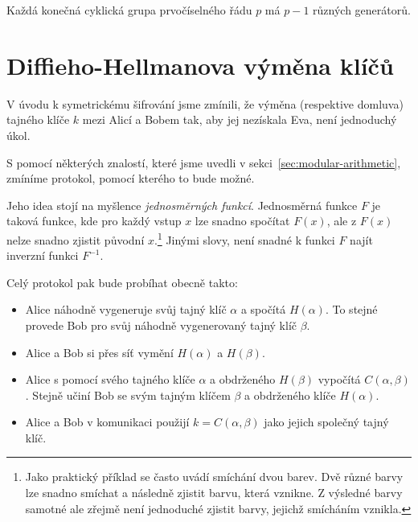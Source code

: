 \documentclass[
  program=infoi,
  biblatex,
  figures=false,
  glossaries,
  index
]{kidiplom}
\begin{document}
    \begin{consequence}\label{con:generators-count}
        Každá konečná cyklická grupa prvočíselného řádu $p$ má $p-1$ různých generátorů.
    \end{consequence}



\section{Diffieho-Hellmanova výměna klíčů}\label{sec:diffie-hellman}



    V úvodu k symetrickému šifrování jsme zmínili, že výměna (respektive domluva)
    tajného klíče $k$ mezi Alicí a Bobem tak, aby jej nezískala Eva, není jednoduchý úkol.

    S pomocí některých znalostí, které jsme uvedli v sekci~\ref{sec:modular-arithmetic}, zmíníme protokol, pomocí kterého
    to bude možné.

    Jeho idea stojí na myšlence \emph{jednosměrných funkcí}. Jednosměrná funkce $F$ je taková funkce, kde pro každý vstup $x$ lze
    snadno spočítat $F(x)$, ale z $F(x)$ nelze snadno zjistit původní $x$.\footnote{Jako praktický příklad se často uvádí smíchání dvou barev.
    Dvě různé barvy lze snadno smíchat a následně zjistit barvu, která vznikne.
    Z výsledné barvy samotné ale zřejmě není jednoduché zjistit barvy, jejichž smícháním vznikla.}
    Jinými slovy, není snadné k funkci $F$ najít inverzní funkci $F^{-1}$.

    \medskip

    Celý protokol pak bude probíhat obecně takto:
    
    \begin{itemize}
        \item
            Alice náhodně vygeneruje svůj tajný klíč $\alpha$ a spočítá $H(\alpha)$.
            To stejné provede Bob pro svůj náhodně vygenerovaný tajný klíč $\beta$.
        \item
            Alice a Bob si přes síť vymění $H(\alpha)$ a $H(\beta)$.
        \item
            Alice s pomocí svého tajného klíče $\alpha$ a obdrženého $H(\beta)$ vypočítá $C(\alpha,\beta)$.
            Stejně učiní Bob se svým tajným klíčem $\beta$ a obdrženého klíče $H(\alpha)$.
        \item
            Alice a Bob v komunikaci použijí $k = C(\alpha,\beta)$ jako jejich společný tajný klíč.
    \end{itemize}
\end{document}
